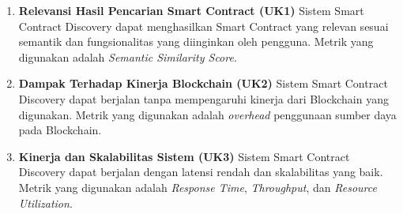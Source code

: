 \begin{enumerate}
  \item \textbf{Relevansi Hasil Pencarian Smart Contract (UK1)} \newline 
  Sistem Smart Contract Discovery dapat menghasilkan Smart Contract yang relevan sesuai semantik dan fungsionalitas yang diinginkan oleh pengguna. Metrik yang digunakan adalah \textit{Semantic Similarity Score}. 
  
  \item \textbf{Dampak Terhadap Kinerja Blockchain (UK2)} \newline 
  Sistem Smart Contract Discovery dapat berjalan tanpa mempengaruhi kinerja dari Blockchain yang digunakan. Metrik yang digunakan adalah \textit{overhead} penggunaan sumber daya pada Blockchain.
  \item \textbf{Kinerja dan Skalabilitas Sistem (UK3)} \newline 
  Sistem Smart Contract Discovery dapat berjalan dengan latensi rendah dan skalabilitas yang baik. Metrik yang digunakan adalah \textit{Response Time}, \textit{Throughput}, dan \textit{Resource Utilization}.
\end{enumerate}